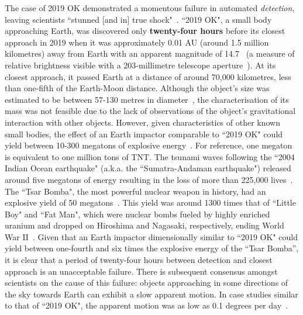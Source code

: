 The case of 2019 OK demonstrated a momentous failure in automated \textit{detection}, leaving scientists ``stunned [and in] true shock"~\cite{chiu_2019}.
``2019 OK", a small body approaching Earth, was discovered only \textbf{twenty-four hours} before its closest approach in 2019 when it was approximately 0.01 AU (around 1.5 million kilometres) away from Earth with an apparent magnitude of 14.7~\cite{IAU2019OK} (a measure of relative brightness visible with a 203-millimetre telescope aperture~\cite[p.~24]{North2014}). At its closest approach, it passed Earth at a distance of around 70,000 kilometres, less than one-fifth of the Earth-Moon distance. Although the object's size was estimated to be between 57-130 metres in diameter~\cite{NASA2019}, the characterisation of its mass was not feasible due to the lack of observations of the object's gravitational interaction with other objects. However, given characteristics of other known small bodies, the effect of an Earth impactor comparable to ``2019 OK" could yield between 10-300 megatons of explosive energy~\cite{Cellino1999, Rumpf2017}. For reference, one megaton is equivalent to one million tons of TNT. The tsunami waves following the ``2004 Indian Ocean earthquake" (a.k.a. the ``Sumatra-Andaman earthquake") released around five megatons of energy resulting in the loss of more than 225,000 lives~\cite{Nirupama2006}. The ``Tsar Bomba", the most powerful nuclear weapon in history, had an explosive yield of 50 megatons~\cite{Khan2020}. This yield was around 1300 times that of ``Little Boy" and ``Fat Man", which were nuclear bombs fueled by highly enriched uranium and dropped on Hiroshima and Nagasaki, respectively, ending World War II~\cite{osti_1489669}. Given that an Earth impactor dimensionally similar to ``2019 OK" could yield between one-fourth and six times the explosive energy of the ``Tsar Bomba'', it is clear that a period of twenty-four hours between detection and closest approach is an unacceptable failure. There is subsequent consensus amongst scientists on the cause of this failure: objects approaching in some directions of the sky towards Earth can exhibit a slow apparent motion. In case studies similar to that of ``2019 OK", the apparent motion was as low as 0.1 degrees per day~\cite{Wainscoat2022}. 


